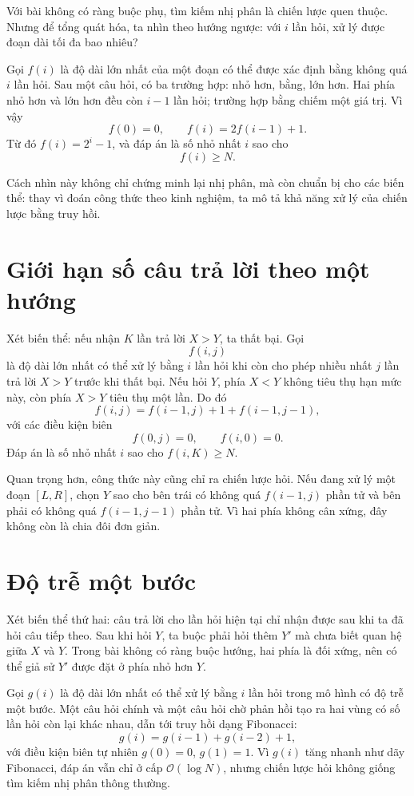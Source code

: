 \documentclass[11pt]{article}
\newcommand{\Oh}{\mathcal{O}}
\begin{document}
Với bài không có ràng buộc phụ, tìm kiếm nhị phân là chiến lược quen thuộc.
Nhưng để tổng quát hóa, ta nhìn theo hướng ngược: với \(i\) lần hỏi, xử lý
được đoạn dài tối đa bao nhiêu?

Gọi \(f(i)\) là độ dài lớn nhất của một đoạn có thể được xác định bằng không
quá \(i\) lần hỏi. Sau một câu hỏi, có ba trường hợp: nhỏ hơn, bằng, lớn hơn.
Hai phía nhỏ hơn và lớn hơn đều còn \(i-1\) lần hỏi; trường hợp bằng chiếm một
giá trị. Vì vậy
\[
  f(0)=0,\qquad f(i)=2f(i-1)+1.
\]
Từ đó \(f(i)=2^i-1\), và đáp án là số nhỏ nhất \(i\) sao cho
\[
  f(i)\ge N.
\]

Cách nhìn này không chỉ chứng minh lại nhị phân, mà còn chuẩn bị cho các biến
thể: thay vì đoán công thức theo kinh nghiệm, ta mô tả khả năng xử lý của
chiến lược bằng truy hồi.

\section{Giới hạn số câu trả lời theo một hướng}

Xét biến thể: nếu nhận \(K\) lần trả lời \(X>Y\), ta thất bại. Gọi
\[
  f(i,j)
\]
là độ dài lớn nhất có thể xử lý bằng \(i\) lần hỏi khi còn cho phép nhiều nhất
\(j\) lần trả lời \(X>Y\) trước khi thất bại. Nếu hỏi \(Y\), phía \(X<Y\) không
tiêu thụ hạn mức này, còn phía \(X>Y\) tiêu thụ một lần. Do đó
\[
  f(i,j)=f(i-1,j)+1+f(i-1,j-1),
\]
với các điều kiện biên
\[
  f(0,j)=0,\qquad f(i,0)=0.
\]
Đáp án là số nhỏ nhất \(i\) sao cho \(f(i,K)\ge N\).

Quan trọng hơn, công thức này cũng chỉ ra chiến lược hỏi. Nếu đang xử lý một
đoạn \([L,R]\), chọn \(Y\) sao cho bên trái có không quá \(f(i-1,j)\) phần tử
và bên phải có không quá \(f(i-1,j-1)\) phần tử. Vì hai phía không cân xứng,
đây không còn là chia đôi đơn giản.

\section{Độ trễ một bước}

Xét biến thể thứ hai: câu trả lời cho lần hỏi hiện tại chỉ nhận được sau khi
ta đã hỏi câu tiếp theo. Sau khi hỏi \(Y\), ta buộc phải hỏi thêm \(Y'\) mà
chưa biết quan hệ giữa \(X\) và \(Y\). Trong bài không có ràng buộc hướng, hai
phía là đối xứng, nên có thể giả sử \(Y'\) được đặt ở phía nhỏ hơn \(Y\).

Gọi \(g(i)\) là độ dài lớn nhất có thể xử lý bằng \(i\) lần hỏi trong mô hình
có độ trễ một bước. Một câu hỏi chính và một câu hỏi chờ phản hồi tạo ra hai
vùng có số lần hỏi còn lại khác nhau, dẫn tới truy hồi dạng Fibonacci:
\[
  g(i)=g(i-1)+g(i-2)+1,
\]
với điều kiện biên tự nhiên \(g(0)=0\), \(g(1)=1\). Vì \(g(i)\) tăng nhanh như
dãy Fibonacci, đáp án vẫn chỉ ở cấp \(\Oh(\log N)\), nhưng chiến lược hỏi
không giống tìm kiếm nhị phân thông thường.
\end{document}
